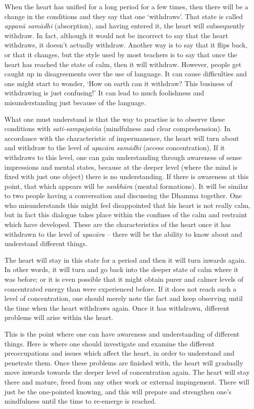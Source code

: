 When the heart has unified for a long period for a few times, then there
will be a change in the conditions and they say that one `withdraws'.
That state is called \emph{appanā samādhi} (absorption), and having
entered it, the heart will subsequently withdraw. In fact, although it
would not be incorrect to say that the heart withdraws, it doesn't
actually withdraw. Another way is to say that it flips back, or that it
changes, but the style used by most teachers is to say that once the
heart has reached the state of calm, then it will withdraw. However,
people get caught up in disagreements over the use of language. It can
cause difficulties and one might start to wonder, `How on earth can it
withdraw? This business of withdrawing is just confusing!' It can lead
to much foolishness and misunderstanding just because of the language.

What one must understand is that the way to practise is to observe these
conditions with \emph{sati-sampajañña} (mindfulness and clear
comprehension). In accordance with the characteristic of impermanence,
the heart will turn about and withdraw to the level of \emph{upacāra
samādhi} (access concentration). If it withdraws to this level, one can
gain understanding through awareness of sense impressions and mental
states, because at the deeper level (where the mind is fixed with just
one object) there is no understanding. If there is awareness at this
point, that which appears will be \emph{sankhāra} (mental formations).
It will be similar to two people having a conversation and discussing
the Dhamma together. One who misunderstands this might feel disappointed
that his heart is not really calm, but in fact this dialogue takes place
within the confines of the calm and restraint which have developed.
These are the characteristics of the heart once it has withdrawn to the
level of \emph{upacāra} -- there will be the ability to know about and
understand different things.

The heart will stay in this state for a period and then it will turn
inwards again. In other words, it will turn and go back into the deeper
state of calm where it was before; or it is even possible that it might
obtain purer and calmer levels of concentrated energy than were
experienced before. If it does not reach such a level of concentration,
one should merely note the fact and keep observing until the time when
the heart withdraws again. Once it has withdrawn, different problems
will arise within the heart.

This is the point where one can have awareness and understanding of
different things. Here is where one should investigate and examine the
different preoccupations and issues which affect the heart, in order to
understand and penetrate them. Once these problems are finished with,
the heart will gradually move inwards towards the deeper level of
concentration again. The heart will stay there and mature, freed from
any other work or external impingement. There will just be the
one-pointed knowing, and this will prepare and strengthen one's
mindfulness until the time to re-emerge is reached.


